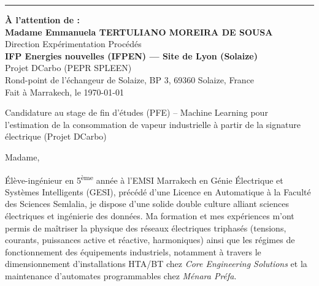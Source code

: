 \documentclass[10pt,a4paper]{altacv}
\makeatletter
\renewcommand{\makecvheader}{%
  \begingroup
    \raggedright\color{emphasis}%
    {\LARGE\bfseries\MakeUppercase{\@name}\par}\vspace{2pt}
    {\normalsize\bfseries\color{accent}\@tagline\par}\vspace{4pt}
    {\footnotesize\color{emphasis}\@personalinfo\par}
  \endgroup\vspace{6pt}
  {\color{heading}\rule{\linewidth}{1.2pt}}\par\vspace{8pt}
}
\makeatother
\begin{document}

\makecvheader

\begin{flushright}
  {\color{emphasis}\textbf{À l'attention de :}} \\[2pt]
  \textbf{Madame Emmanuela TERTULIANO MOREIRA DE SOUSA} \\
  Direction Expérimentation Procédés \\
  \textbf{IFP Energies nouvelles (IFPEN) — Site de Lyon (Solaize)} \\
  Projet DCarbo (PEPR SPLEEN) \\
  Rond-point de l’échangeur de Solaize, BP 3, 69360 Solaize, France \\[8pt]
  Fait à Marrakech, le \today
\end{flushright}
\vspace{4pt}

 Candidature au stage de fin d'études (PFE) -- Machine Learning pour l'estimation de la consommation de vapeur industrielle à partir de la signature électrique (Projet DCarbo)

\vspace{8pt}

\noindent Madame,

\vspace{5pt}

Élève-ingénieur en 5\textsuperscript{ème} année à l'EMSI Marrakech en Génie Électrique et Systèmes Intelligents (GESI), précédé d'une Licence en Automatique à la Faculté des Sciences Semlalia, je dispose d'une solide double culture alliant sciences électriques et ingénierie des données. Ma formation et mes expériences m'ont permis de maîtriser la physique des réseaux électriques triphasés (tensions, courants, puissances active et réactive, harmoniques) ainsi que les régimes de fonctionnement des équipements industriels, notamment à travers le dimensionnement d'installations HTA/BT chez \textit{Core Engineering Solutions} et la maintenance d'automates programmables chez \textit{Ménara Préfa}.
\end{document}
